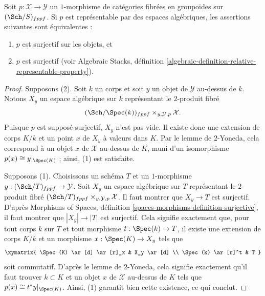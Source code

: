 \begin{lemma}
\label{lemma-representable-by-spaces-surjective}
Soit $p : \mathcal{X} \to \mathcal{Y}$ un $1$-morphisme de catégories
fibrées en groupoïdes sur $(\Sch/S)_{fppf}$. Si $p$ est
représentable par des espaces algébriques, les assertions suivantes sont équivalentes :
\begin{enumerate}
\item $p$ est surjectif sur les objets, et
\item $p$ est surjectif (voir
Algebraic Stacks,
définition \ref{algebraic-definition-relative-representable-property}).
\end{enumerate}
\end{lemma}

\begin{proof}
Supposons (2). Soit $k$ un corps et soit $y$ un objet de
$\mathcal{Y}$ au-dessus de $k$. Notons $X_y$ un espace algébrique sur $k$
représentant le $2$-produit fibré
$$
(\Sch/\Spec(k))_{fppf} \times_{y, \mathcal{Y}, p} \mathcal{X}.
$$
Puisque $p$ est supposé surjectif, $X_y$ n'est pas vide.
Il existe donc une extension de corps $K/k$ et un point $x$ de $X_y$
à valeurs dans $K$. Par le lemme de $2$-Yoneda, cela correspond à un objet
$x$ de $\mathcal{X}$ au-dessus de $K$, muni d'un isomorphisme
$p(x) \cong y|_{\Spec(K)}$ ; ainsi, (1) est satisfaite.

\medskip\noindent
Supposons (1). Choisissons un schéma $T$ et un $1$-morphisme
$y : (\Sch/T)_{fppf} \to \mathcal{Y}$. Soit
$X_y$ un espace algébrique sur $T$ représentant le $2$-produit fibré
$(\Sch/T)_{fppf} \times_{y, \mathcal{Y}, p} \mathcal{X}$.
Il faut montrer que $X_y \to T$ est surjectif. D'après
Morphisms of Spaces, définition \ref{spaces-morphisms-definition-surjective},
il faut montrer que $|X_y| \to |T|$ est surjectif.
Cela signifie exactement que, pour tout corps $k$ sur $T$ et tout
morphisme $t : \Spec(k) \to T$, il existe une extension de corps
$K/k$ et un morphisme $x : \Spec(K) \to X_y$ tels que
$$
\xymatrix{
\Spec(K) \ar[d] \ar[r]_x & X_y \ar[d] \\
\Spec(k) \ar[r]^t & T
}
$$
soit commutatif. D'après le lemme de $2$-Yoneda, cela signifie exactement qu'il faut trouver
$k \subset K$ et un objet $x$ de $\mathcal{X}$ au-dessus de $K$ tels que
$p(x) \cong t^*y|_{\Spec(K)}$. Ainsi, (1) garantit bien cette
existence, ce qui conclut.
\end{proof}












